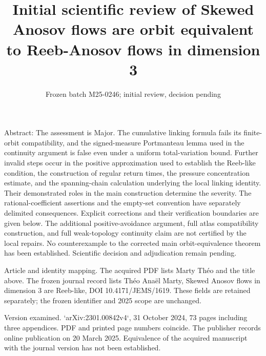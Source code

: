 \documentclass[10pt]{article}
\title{Initial scientific review of
Skewed Anosov flows are orbit equivalent to
Reeb-Anosov flows in dimension 3}
\author{}
\date{Frozen batch M25-0246; initial review, decision pending}
\begin{document}
\maketitle
Abstract: The assessment is Major. The cumulative linking formula fails its finite-orbit compatibility, and the signed-measure Portmanteau lemma used in the continuity argument is false even under a uniform total-variation bound. Further invalid steps occur in the positive approximation used to establish the Reeb-like condition, the construction of regular return times, the pressure concentration estimate, and the spanning-chain calculation underlying the local linking identity. Their demonstrated roles in the main construction determine the severity. The rational-coefficient assertions and the empty-set convention have separately delimited consequences. Explicit corrections and their verification boundaries are given below. The additional positive-avoidance argument, full atlas compatibility construction, and full weak-topology continuity claim are not certified by the local repairs. No counterexample to the corrected main orbit-equivalence theorem has been established. Scientific decision and adjudication remain pending.\par
Article and identity mapping. The acquired PDF lists Marty Théo and the title above. The frozen journal record lists Théo Anaël Marty, Skewed Anosov flows in dimension 3 are Reeb-like, DOI 10.4171/JEMS/1619. These fields are retained separately; the frozen identifier and 2025 scope are unchanged.\par
Version examined. `arXiv:2301.00842v4`, 31 October 2024, 73 pages including three appendices. PDF and printed page numbers coincide. The publisher records online publication on 20 March 2025. Equivalence of the acquired manuscript with the journal version has not been established.\par
\end{document}
